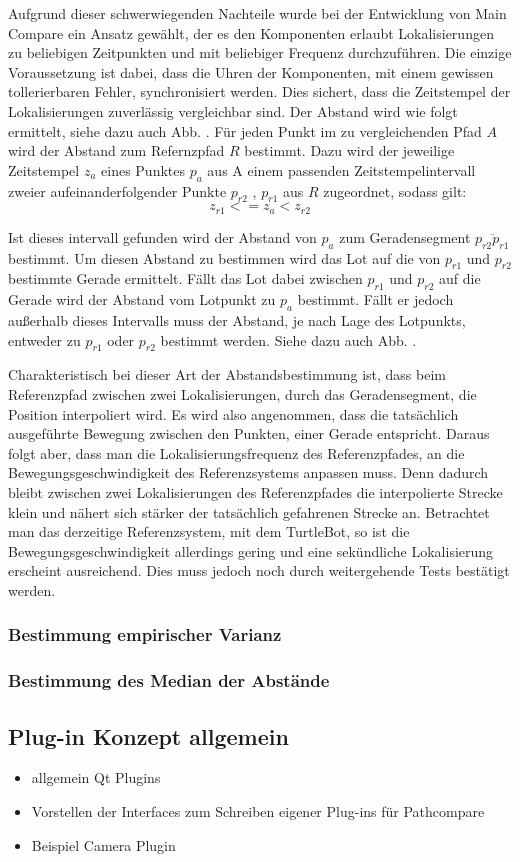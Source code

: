 Aufgrund dieser schwerwiegenden Nachteile wurde bei der Entwicklung von Main
Compare ein Ansatz gewählt, der es den Komponenten erlaubt Lokalisierungen zu
beliebigen Zeitpunkten und mit beliebiger Frequenz durchzuführen. Die einzige
Voraussetzung ist dabei, dass die Uhren der Komponenten, mit einem gewissen
tollerierbaren Fehler, synchronisiert werden. Dies sichert, dass die Zeitstempel der
Lokalisierungen zuverlässig vergleichbar sind. Der Abstand wird wie folgt
ermittelt, siehe dazu auch Abb. . Für jeden Punkt im zu vergleichenden Pfad $A$
wird der Abstand zum Refernzpfad $R$ bestimmt. Dazu wird der jeweilige
Zeitstempel $z_a$ eines Punktes $p_a$ aus A einem passenden
Zeitstempelintervall zweier aufeinanderfolgender Punkte $p_{r2}$ , $p_{r1}$ aus $R$ zugeordnet, sodass
gilt:
\[
z_{r1} <= z_a < z_{r2}
\]

Ist dieses intervall gefunden wird der Abstand von $p_a$ zum Geradensegment
$\overline{p_{r2} p_{r1}}$ bestimmt. Um diesen Abstand zu bestimmen wird das
Lot auf die von $p_{r1}$ und $p_{r2}$ bestimmte Gerade ermittelt. Fällt das Lot
dabei zwischen $p_{r1}$ und $p_{r2}$ auf die Gerade wird der Abstand vom
Lotpunkt zu $p_a$ bestimmt. Fällt er jedoch außerhalb dieses Intervalls muss
der Abstand, je nach Lage des Lotpunkts, entweder zu $p_{r1}$ oder $p_{r2}$
bestimmt werden. Siehe dazu auch Abb. .

Charakteristisch bei dieser Art der Abstandsbestimmung ist, dass beim
Referenzpfad zwischen zwei Lokalisierungen, durch das Geradensegment, die
Position interpoliert wird. Es wird also angenommen, dass die tatsächlich ausgeführte
Bewegung zwischen den Punkten, einer Gerade entspricht. Daraus folgt aber, dass man die
Lokalisierungsfrequenz des Referenzpfades, an die Bewegungsgeschwindigkeit des
Referenzsystems anpassen muss. Denn dadurch bleibt zwischen zwei
Lokalisierungen des Referenzpfades die
interpolierte Strecke klein und nähert sich stärker der tatsächlich gefahrenen
Strecke an. Betrachtet man das derzeitige Referenzsystem, mit dem TurtleBot, so
ist die Bewegungsgeschwindigkeit allerdings gering und eine sekündliche Lokalisierung
erscheint ausreichend. Dies muss jedoch noch durch weitergehende Tests
bestätigt werden.


\subsubsection{Bestimmung empirischer Varianz}

\subsubsection{Bestimmung des Median der Abstände}

\subsection{Plug-in Konzept allgemein}
\begin{itemize}
  \item allgemein Qt Plugins
  \item Vorstellen der Interfaces zum Schreiben eigener Plug-ins für Pathcompare
  \item Beispiel Camera Plugin
\end{itemize}
